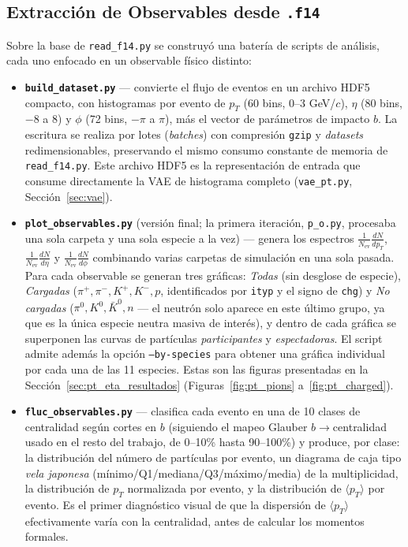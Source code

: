 \subsection{Extracción de Observables desde \texttt{.f14}}
\label{sec:pipeline_observables}

\noindent
Sobre la base de \texttt{read\_f14.py} se construyó una batería de scripts
de análisis, cada uno enfocado en un observable físico distinto:

\begin{itemize}

\item \textbf{\texttt{build\_dataset.py}} — convierte el flujo de eventos en
un archivo HDF5 compacto, con histogramas por evento de $p_T$ (60 bins,
0--3 GeV/$c$), $\eta$ (80 bins, $-8$ a $8$) y $\phi$ (72 bins, $-\pi$ a
$\pi$), más el vector de parámetros de impacto $b$. La escritura se realiza
por lotes (\textit{batches}) con compresión \texttt{gzip} y \textit{datasets}
redimensionables, preservando el mismo consumo constante de memoria de
\texttt{read\_f14.py}. Este archivo HDF5 es la representación de entrada
que consume directamente la VAE de histograma completo
(\texttt{vae\_pt.py}, Sección~\ref{sec:vae}).

\item \textbf{\texttt{plot\_observables.py}} (versión final; la primera
iteración, \texttt{p\_o.py}, procesaba una sola carpeta y una sola especie a
la vez) — genera los espectros $\frac{1}{N_{\text{ev}}}\frac{dN}{dp_T}$,
$\frac{1}{N_{\text{ev}}}\frac{dN}{d\eta}$ y $\frac{1}{N_{\text{ev}}}\frac{dN}{d\phi}$
combinando varias carpetas de simulación en una sola pasada. Para cada
observable se generan tres gráficas: \emph{Todas} (sin desglose de especie),
\emph{Cargadas} ($\pi^{+},\pi^{-},K^{+},K^{-},p$, identificados por
\texttt{ityp} y el signo de \texttt{chg}) y \emph{No cargadas}
($\pi^{0},K^{0},\bar{K}^{0},n$ — el neutrón solo aparece en este último
grupo, ya que es la única especie neutra masiva de interés), y dentro de
cada gráfica se superponen las curvas de partículas \emph{participantes}
y \emph{espectadoras}. El script admite además la opción
\texttt{--by-species} para obtener una gráfica individual por cada una de
las 11 especies. Estas son las figuras presentadas en la
Sección~\ref{sec:pt_eta_resultados} (Figuras~\ref{fig:pt_pions}
a~\ref{fig:pt_charged}).

\item \textbf{\texttt{fluc\_observables.py}} — clasifica cada evento en una
de 10 clases de centralidad según cortes en $b$ (siguiendo el mapeo
Glauber $b\!\to\!$centralidad usado en el resto del trabajo, de 0--10\%
hasta 90--100\%) y produce, por clase: la distribución del número de
partículas por evento, un diagrama de caja tipo \textit{vela japonesa}
(mínimo/Q1/mediana/Q3/máximo/media) de la multiplicidad, la distribución
de $p_T$ normalizada por evento, y la distribución de $\langle p_T\rangle$
por evento. Es el primer diagnóstico visual de que la dispersión de
$\langle p_T\rangle$ efectivamente varía con la centralidad, antes de
calcular los momentos formales.


\end{itemize}

